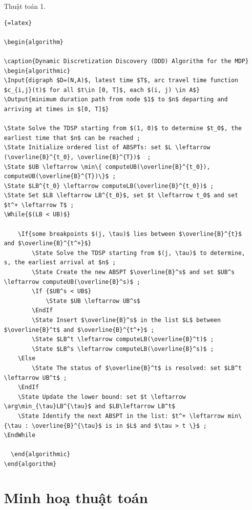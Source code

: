 \documentclass[14pt,oneside]{scrbook}
\newcommand{\Input}{\item[\textbf{Input:}]}
\renewcommand{\Output}{\item[\textbf{Output:}]}
\begin{document}
Thuật toán 1.

\begin{lstlisting}
{=latex}

\begin{algorithm}

\caption{Dynamic Discretization Discovery (DDD) Algorithm for the MDP}
\begin{algorithmic}
\Input{digraph $D=(N,A)$, latest time $T$, arc travel time function $c_{i,j}(t)$ for all $t\in [0, T]$, each $(i, j) \in A$}
\Output{minimum duration path from node $1$ to $n$ departing and arriving at times in $[0, T]$}

\State Solve the TDSP starting from $(1, 0)$ to determine $t_0$, the earliest time that $n$ can be reached ;
\State Initialize ordered list of ABSPTs: set $L \leftarrow (\overline{B}^{t_0}, \overline{B}^{T})$  ;
\State $UB \leftarrow \min\{ computeUB(\overline{B}^{t_0}), computeUB(\overline{B}^{T})\}$ ;
\State $LB^{t_0} \leftarrow computeLB(\overline{B}^{t_0})$ ;
\State Set $LB \leftarrow LB^{t_0}$, set $t \leftarrow t_0$ and set $t^+ \leftarrow T$ ;
\While{$(LB < UB)$}

    \If{some breakpoints $(j, \tau)$ lies between $\overline{B}^{t}$ and $\overline{B}^{t^+}$}
        \State Solve the TDSP starting from $(j, \tau)$ to determine, s, the earliest arrival at $n$ ;
        \State Create the new ABSPT $\overline{B}^s$ and set $UB^s \leftarrow computeUB(\overline{B}^s)$ ;
        \If {$UB^s < UB$} 
            \State $UB \leftarrow UB^s$
        \EndIf
        \State Insert $\overline{B}^s$ in the list $L$ between $\overline{B}^t$ and $\overline{B}^{t^+}$ ;
        \State $LB^t \leftarrow computeLB(\overline{B}^t)$ ;
        \State $LB^s \leftarrow computeLB(\overline{B}^s)$ ;
    \Else
        \State The status of $\overline{B}^t$ is resolved: set $LB^t \leftarrow UB^t$ ;
    \EndIf
    \State Update the lower bound: set $t \leftarrow \arg\min_{\tau}LB^{\tau}$ and $LB\leftarrow LB^t$ 
    \State Identify the next ABSPT in the list: $t^+ \leftarrow min\{\tau : \overline{B}^{\tau}$ is in $L$ and $\tau > t \}$ ;
\EndWhile
  
  \end{algorithmic}
\end{algorithm}
\end{lstlisting}

\section{Minh hoạ thuật toán}\label{minh-houx1ea1-thuux1eadt-touxe1n}
\end{document}
